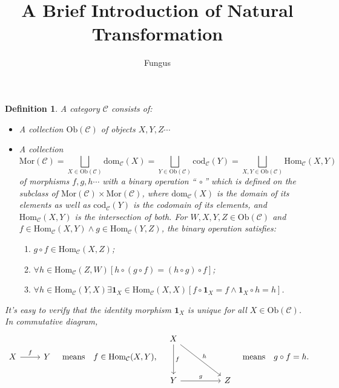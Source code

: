 \documentclass{article}
\title{A Brief Introduction of Natural Transformation}
\author{Fungus}
\begin{document}
\maketitle
\newtheorem{defi}{Definition}
\newtheorem{thm}{Theorem}
\newcommand\Ob{\mathrm{Ob}}
\newcommand\Mor{\mathrm{Mor}}
\newcommand\Hom{\mathrm{Hom}}
\newcommand\id{\mathrm{id}}
\newcommand\C{\mathcal{C}}
\newcommand\D{\mathcal{D}}
\newcommand\1{\mathbf{1}}

\begin{defi}\label{category}
	A \emph{category} $\C$ consists of:
	\begin{itemize}
		\item A collection $\Ob(\C)$ of \emph{objects} $X,Y,Z\cdots$
		\item A collection 
			$$\Mor(\C)=\bigsqcup_{X\in\Ob(\C)}{\mathrm{dom}_\C(X)}=\bigsqcup_{Y\in\Ob(\C)}{\mathrm{cod}_\C(Y)}=\bigsqcup_{X,Y\in\Ob(\C)}{\Hom_\C(X,Y)}$$
			of \emph{morphisms} $f,g,h\cdots$ with a binary operation ``$\ \circ$'' which is defined on the subclass of $\Mor(\C)\times\Mor(\C)$, where $\mathrm{dom}_\C(X)$ is the \emph{domain} of its elements as well as $\mathrm{cod}_\C(Y)$ is the \emph{codomain} of its elements, and $\Hom_\C(X,Y)$ is the intersection of both. For $W,X,Y,Z\in\Ob(\C)$ and $f\in\Hom_\C(X,Y)\wedge g\in\Hom_\C(Y,Z)$, the binary operation satisfies:
			\begin{enumerate}
				\item $g\circ f\in\Hom_\C(X,Z)$;
				\item $\forall h\in\Hom_\C(Z,W)[h\circ(g\circ f)=(h\circ g)\circ f]$;
				\item $\forall h\in\Hom_\C(Y,X)\exists \1_X\in\Hom_\C(X,X)[f\circ\1_X=f\wedge\1_X\circ h=h]$.
			\end{enumerate}
	\end{itemize}
	
	It's easy to verify that the \emph{identity morphism} $\1_X$ is unique for all $X\in\Ob(\C)$.\\
	In commutative diagram,
	\[\begin{tikzcd}
			X\arrow[r,"f"] & Y
		\end{tikzcd}\quad\text{means}\quad f\in\Hom_\C(X,Y),\quad
		\begin{tikzcd}
			X\arrow[dd,"f"]\arrow[rrdd,"h"] & & \\ & & \\
			Y\arrow[rr,"g"] & & Z
		\end{tikzcd}\quad\text{means}\quad g\circ f=h.\]
\end{defi}
\end{document}
